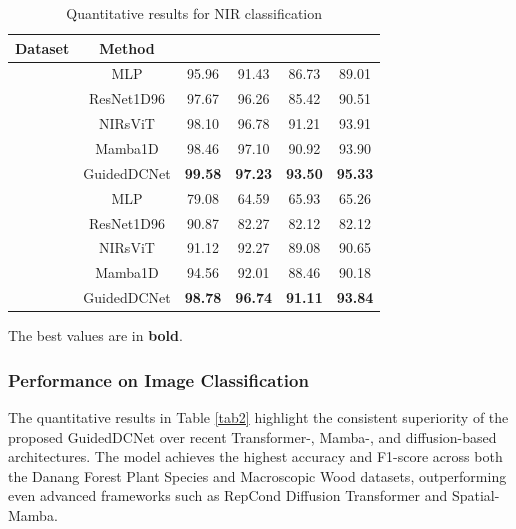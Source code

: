 \documentclass[a4paper,fleqn]{cas-sc}
\begin{document}
\begin{table}[!h]
\centering
\begin{threeparttable}
\caption{Quantitative results for NIR classification}
\label{tab1}
\renewcommand{\arraystretch}{1.0}
\begin{tabular}{ c c c c c c }
\hline
\textbf{Dataset} & \textbf{Method} & \textbf{} & \textbf{} & \textbf{} & \textbf{} \\ 
\hline
{} 
& MLP \cite{popescu2009multilayer} & 95.96 & 91.43 & 86.73 & 89.01 \\
& ResNet1D96 \cite{hong2020holmes} & 97.67 & 96.26 & 85.42 & 90.51 \\
& NIRsViT \cite{hieu2024nirsvit} & 98.10 & 96.78 & 91.21 & 93.91 \\
& Mamba1D \cite{gu2024mamba} & 98.46 & 97.10 & 90.92 & 93.90 \\
& GuidedDCNet & \textbf{99.58} & \textbf{97.23} & \textbf{93.50} & \textbf{95.33} \\
\hline
{} 
& MLP \cite{popescu2009multilayer} & 79.08 & 64.59 & 65.93 & 65.26 \\
& ResNet1D96 \cite{hong2020holmes} & 90.87 & 82.27 & 82.12 & 82.12 \\
& NIRsViT \cite{hieu2024nirsvit} & 91.12 & 92.27 & 89.08 & 90.65 \\
& Mamba1D \cite{gu2024mamba} & 94.56 & 92.01 & 88.46 & 90.18 \\
& GuidedDCNet & \textbf{98.78} & \textbf{96.74} & \textbf{91.11} & \textbf{93.84} \\
\hline
\end{tabular}
\begin{tablenotes}
\footnotesize
\item The best values are in \textbf{bold}.
\end{tablenotes}
\end{threeparttable}
\end{table}

\subsubsection{Performance on Image Classification}

The quantitative results in Table \ref{tab2} highlight the consistent superiority of the proposed GuidedDCNet over recent Transformer-, Mamba-, and diffusion-based architectures. The model achieves the highest accuracy and F1-score across both the Danang Forest Plant Species and Macroscopic Wood datasets, outperforming even advanced frameworks such as RepCond Diffusion Transformer and Spatial-Mamba.
\end{document}
